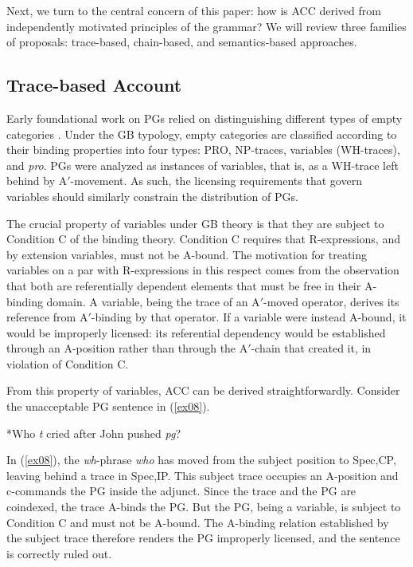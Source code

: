 \documentclass[12pt]{article}
\begin{document}
Next, we turn to the central concern of this paper: how is ACC derived from independently motivated principles of the grammar? We will review three families of proposals: trace-based, chain-based, and semantics-based approaches.

\subsection{Trace-based Account}
Early foundational work on PGs relied on distinguishing different types of empty categories \citep{chomsky1981, chomsky1982}. Under the GB typology, empty categories are classified according to their binding properties into four types: PRO, NP-traces, variables (WH-traces), and \textit{pro}. PGs were analyzed as instances of variables, that is, as a WH-trace left behind by A$'$-movement. As such, the licensing requirements that govern variables should similarly constrain the distribution of PGs.

The crucial property of variables under GB theory is that they are subject to Condition C of the binding theory. Condition C requires that R-expressions, and by extension variables, must not be A-bound. The motivation for treating variables on a par with R-expressions in this respect comes from the observation that both are referentially dependent elements that must be free in their A-binding domain. A variable, being the trace of an A$'$-moved operator, derives its reference from A$'$-binding by that operator. If a variable were instead A-bound, it would be improperly licensed: its referential dependency would be established through an A-position rather than through the A$'$-chain that created it, in violation of Condition C.

From this property of variables, ACC can be derived straightforwardly. Consider the unacceptable PG sentence in (\ref{ex08}).

\ex\label{ex08}{*Who \textit{t} cried after John pushed \textit{pg}?}
\xe

\noindent
In (\ref{ex08}), the \emph{wh}-phrase \emph{who} has moved from the subject position to Spec,CP, leaving behind a trace in Spec,IP. This subject trace occupies an A-position and c-commands the PG inside the adjunct. Since the trace and the PG are coindexed, the trace A-binds the PG. But the PG, being a variable, is subject to Condition C and must not be A-bound. The A-binding relation established by the subject trace therefore renders the PG improperly licensed, and the sentence is correctly ruled out.
\end{document}
